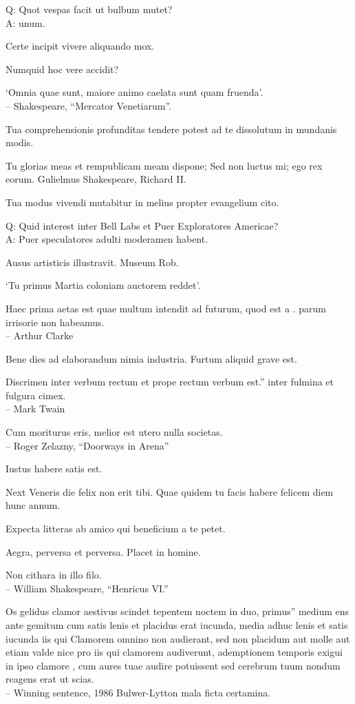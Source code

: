 \documentclass[titlepage,12pt]{memoir}
\begin{document}
Q: Quot vespas facit ut bulbum mutet?\\
A: unum.

Certe incipit vivere aliquando mox.

Numquid hoc vere accidit?

‘Omnia quae sunt, maiore animo caelata sunt quam fruenda’.
\\-- Shakespeare, “Mercator Venetiarum”.

Tua comprehensionis profunditas tendere potest ad te dissolutum in mundanis modis.

Tu glorias meas et rempublicam meam dispone;
Sed non luctus mi; ego rex eorum.
Gulielmus Shakespeare, Richard II.

Tua modus vivendi mutabitur in melius propter evangelium cito.

Q: Quid interest inter Bell Labs et Puer Exploratores Americae?\\
A: Puer speculatores adulti moderamen habent.

Ausus artisticis illustravit. Museum Rob.

‘Tu primus Martia coloniam auctorem reddet’.

Haec prima aetas est quae multum intendit ad futurum, quod est a .
parum irrisorie non habeamus.
\\-- Arthur Clarke

Bene dies ad elaborandum nimia industria. Furtum aliquid grave est.

Discrimen inter verbum rectum et prope rectum verbum est.”
inter fulmina et fulgura cimex.
\\-- Mark Twain

Cum moriturus eris, melior est utero nulla societas.
\\-- Roger Zelazny, “Doorways in Arena”

Iustus habere satis est.

Next Veneris die felix non erit tibi. Quae quidem tu facis
habere felicem diem hunc annum.

Expecta litteras ab amico qui beneficium a te petet.

Aegra, perversa et perversa. Placet in homine.

Non cithara in illo filo.
\\-- William Shakespeare, “Henricus VI.”

Os gelidus clamor aestivus scindet tepentem noctem in duo, primus”
medium ens ante gemitum cum satis lenis et placidus erat
iucunda, media adhuc lenis et satis iucunda iis qui
Clamorem omnino non audierant, sed non placidum aut molle aut etiam valde nice
pro iis qui clamorem audiverunt, ademptionem temporis exigui
in ipso clamore , cum aures tuae audire potuissent
sed cerebrum tuum nondum reagens erat ut scias.
\\-- Winning sentence, 1986 Bulwer-Lytton mala ficta certamina.
\end{document}
